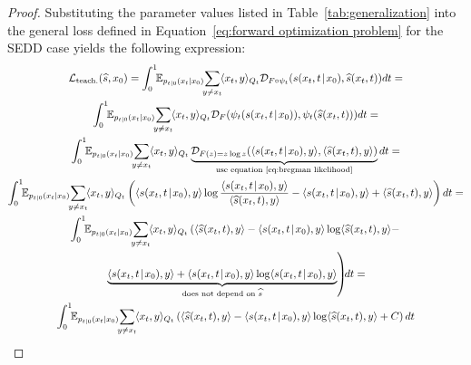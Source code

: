         \begin{proof}
            Substituting the parameter values listed in Table~\ref{tab:generalization} into the general loss defined in Equation~\eqref{eq:forward optimization problem} for the SEDD case yields the following expression:
            \begin{gather}
                \LC_{\text{teach.}}(\widehat{s}, x_0) = \int_0^1 \!\! \EE_{p_{t|0}(x_t|x_0)} \!\! \sum_{y \neq x_t}\!  \langle x_t, y\rangle_{Q_t} \DC_{F\circ\psi_t}\!\left(s(x_t, t \!\mid\! x_0), \widehat{s}(x_t, t)\right) \!dt = 
                \nonumber\\
                \int_0^1 \!\! \EE_{p_{t|0}(x_t|x_0)} \!\! \sum_{y \neq x_t}\!  \langle x_t, y\rangle_{Q_t} \DC_{F}\!\left(\psi_t(s(x_t, t \!\mid\! x_0)), \psi_t(\widehat{s}(x_t, t)\right)) dt = 
                \nonumber\\
                \int_0^1 \!\! \EE_{p_{t|0}(x_t|x_0)} \!\! \sum_{y \neq x_t}\!  \langle x_t, y\rangle_{Q_t} \underbrace{\DC_{F(z) = z \log z}\!\left(\langle s(x_t, t \!\mid\! x_0), y\rangle, \langle \widehat{s}(x_t, t), y \rangle\right)}_{\text{use equation~\eqref{eq:bregman likelihood}}} dt =
                \nonumber\\
                \int_0^1 \!\! \EE_{p_{t|0}(x_t|x_0)} \!\! \sum_{y \neq x_t}\!  \langle x_t, y\rangle_{Q_t} \left(\langle s(x_t, t \!\mid\! x_0), y\rangle \log \frac{\langle s(x_t, t \!\mid\! x_0), y\rangle}{\langle \widehat{s}(x_t, t), y \rangle} -\langle s(x_t, t \!\mid\! x_0), y\rangle + \langle \widehat{s}(x_t, t), y \rangle \right) dt =
                \nonumber\\
                \int_0^1 \!\! \EE_{p_{t|0}(x_t|x_0)} \!\! \sum_{y \neq x_t}\!  \langle x_t, y\rangle_{Q_t} \left(\langle \widehat{s}(x_t, t), y \rangle - \langle s(x_t, t \!\mid\! x_0), y\rangle \log \langle \widehat{s}(x_t, t), y \rangle - \right. \nonumber\\
                                                                                                             \left. \underbrace{\langle s(x_t, t \!\mid\! x_0), y\rangle + \langle s(x_t, t \!\mid\! x_0), y\rangle \log \langle s(x_t, t \!\mid\! x_0), y\rangle}_{\text{does not depend on } \widehat{s}} \right) \!\! dt =
                \nonumber\\
                \int_0^1 \!\! \EE_{p_{t|0}(x_t|x_0)} \!\! \sum_{y \neq x_t}\!  \langle x_t, y\rangle_{Q_t} \left(\langle \widehat{s}(x_t, t), y \rangle - \langle s(x_t, t \!\mid\! x_0), y\rangle \log \langle \widehat{s}(x_t, t), y \rangle + C \right) dt
            \end{gather}
        \end{proof}
